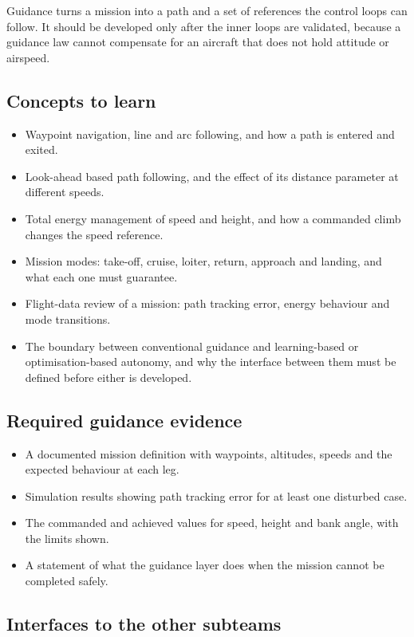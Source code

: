 \documentclass[11pt,a4paper]{article}
\begin{document}
Guidance turns a mission into a path and a set of references the control loops
can follow. It should be developed only after the inner loops are validated,
because a guidance law cannot compensate for an aircraft that does not hold
attitude or airspeed.

\subsection{Concepts to learn}

\begin{itemize}
  \item Waypoint navigation, line and arc following, and how a path is entered and exited.
  \item Look-ahead based path following, and the effect of its distance parameter at different speeds.
  \item Total energy management of speed and height, and how a commanded climb changes the speed reference.
  \item Mission modes: take-off, cruise, loiter, return, approach and landing, and what each one must guarantee.
  \item Flight-data review of a mission: path tracking error, energy behaviour and mode transitions.
  \item The boundary between conventional guidance and learning-based or optimisation-based autonomy, and why the interface between them must be defined before either is developed.
\end{itemize}

\subsection{Required guidance evidence}

\begin{itemize}
  \item A documented mission definition with waypoints, altitudes, speeds and the expected behaviour at each leg.
  \item Simulation results showing path tracking error for at least one disturbed case.
  \item The commanded and achieved values for speed, height and bank angle, with the limits shown.
  \item A statement of what the guidance layer does when the mission cannot be completed safely.
\end{itemize}

\subsection{Interfaces to the other subteams}
\end{document}
